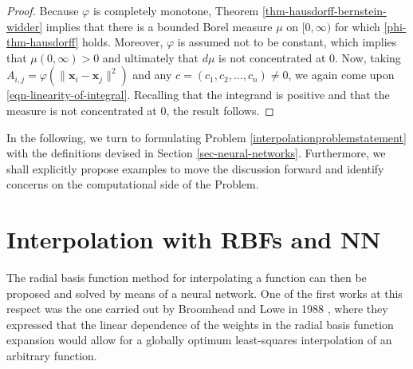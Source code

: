 \documentclass[12pt]{report} %
\newcommand{\tmmathbf}[1]{\ensuremath{\boldsymbol{#1}}}
\begin{document}
\begin{proof}
  Because $\varphi$ is completely monotone, Theorem
\ref{thm-hausdorff-bernstein-widder} implies that there is a bounded Borel
measure $\mu$ on $[0, \infty)$ for which \eqref{phi-thm-hausdorff} holds.
Moreover, $\varphi$ is assumed not to be constant, which implies that $\mu (0,
\infty) > 0$ and ultimately that $d \mu$ is not concentrated at $0$. Now,
taking $A_{i, j} = \varphi (\| \tmmathbf{x}_i -\tmmathbf{x}_j \|^2)$ and any
$c = (c_1, c_2, \ldots, c_n) \neq 0$, we again come upon
\eqref{eqn-linearity-of-integral}. Recalling that the integrand is positive
and that the measure is not concentrated at $0$, the result follows.
\end{proof}

In the following, we turn to formulating Problem \ref{interpolationproblemstatement}
with the definitions devised in Section \ref{sec-neural-networks}. Furthermore,
we shall explicitly propose examples to move the discussion forward and identify
concerns on the computational side of the Problem.

\section{Interpolation with RBFs and NN}

The radial basis function method for interpolating a function can then be
proposed and solved by means of a neural network. One of the first works at
this respect was the one carried out by Broomhead and Lowe in 1988
{\cite{broomhead1988multivariable}}, where they expressed that the linear
dependence of the weights in the radial basis function expansion would allow
for a globally optimum least-squares interpolation of an arbitrary function.
\end{document}
